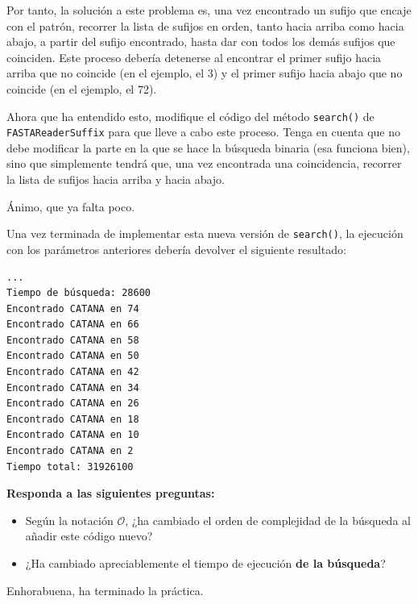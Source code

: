 \documentclass[10pt,a4paper,spanish]{article}
\newcommand{\code}[1]{\texttt{#1}}
\newcommand{\bigO}{\mathcal{O}}
\begin{document}
Por tanto, la solución a este problema es, una vez encontrado un sufijo que encaje con el patrón, recorrer la lista de sufijos en orden, tanto hacia arriba como hacia abajo, a partir del sufijo encontrado, hasta dar con todos los demás sufijos que coinciden. Este proceso debería detenerse al encontrar el primer sufijo hacia arriba que no coincide (en el ejemplo, el 3) y el primer sufijo hacia abajo que no coincide (en el ejemplo, el 72).

Ahora que ha entendido esto, modifique el código del método \code{search()} de \code{FASTAReaderSuffix} para que lleve a cabo este proceso. Tenga en cuenta que no debe modificar la parte en la que se hace la búsqueda binaria (esa funciona bien), sino que simplemente tendrá que, una vez encontrada una coincidencia, recorrer la lista de sufijos hacia arriba y hacia abajo.

Ánimo, que ya falta poco.

Una vez terminada de implementar esta nueva versión de \code{search()}, la ejecución con los parámetros anteriores debería devolver el siguiente resultado:

\begin{verbatim}
...
Tiempo de búsqueda: 28600
Encontrado CATANA en 74
Encontrado CATANA en 66
Encontrado CATANA en 58
Encontrado CATANA en 50
Encontrado CATANA en 42
Encontrado CATANA en 34
Encontrado CATANA en 26
Encontrado CATANA en 18
Encontrado CATANA en 10
Encontrado CATANA en 2
Tiempo total: 31926100
\end{verbatim}

\textbf{Responda a las siguientes preguntas:}

\begin{itemize}
    \item Según la notación $\bigO$, ¿ha cambiado el orden de complejidad de la búsqueda al añadir este código nuevo?
    \item ¿Ha cambiado apreciablemente el tiempo de ejecución \textbf{de la búsqueda}?
\end{itemize}

Enhorabuena, ha terminado la práctica.
\end{document}
